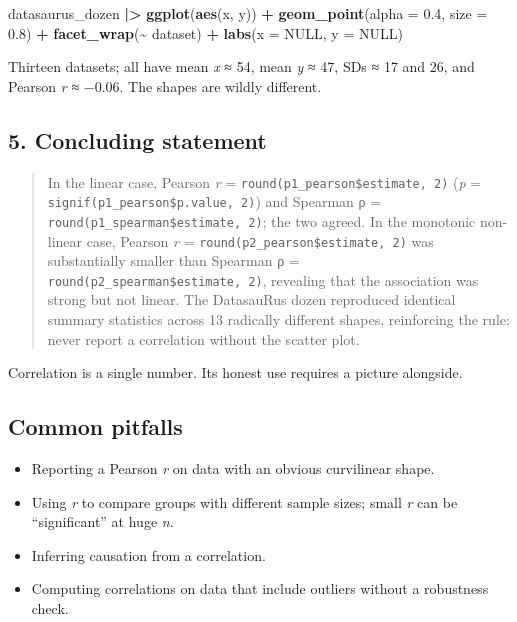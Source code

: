 \documentclass[
]{article}
\newenvironment{Shaded}{\begin{snugshade}}{\end{snugshade}}
\newcommand{\AttributeTok}[1]{\textcolor[rgb]{0.13,0.29,0.53}{#1}}
\newcommand{\ConstantTok}[1]{\textcolor[rgb]{0.56,0.35,0.01}{#1}}
\newcommand{\FloatTok}[1]{\textcolor[rgb]{0.00,0.00,0.81}{#1}}
\newcommand{\FunctionTok}[1]{\textcolor[rgb]{0.13,0.29,0.53}{\textbf{#1}}}
\newcommand{\NormalTok}[1]{#1}
\newcommand{\SpecialCharTok}[1]{\textcolor[rgb]{0.81,0.36,0.00}{\textbf{#1}}}
\providecommand{\tightlist}{%
  \setlength{\itemsep}{0pt}\setlength{\parskip}{0pt}}
\begin{document}
\begin{Shaded}
\begin{Highlighting}[]
\NormalTok{datasaurus\_dozen }\SpecialCharTok{|\textgreater{}}
  \FunctionTok{ggplot}\NormalTok{(}\FunctionTok{aes}\NormalTok{(x, y)) }\SpecialCharTok{+}
  \FunctionTok{geom\_point}\NormalTok{(}\AttributeTok{alpha =} \FloatTok{0.4}\NormalTok{, }\AttributeTok{size =} \FloatTok{0.8}\NormalTok{) }\SpecialCharTok{+}
  \FunctionTok{facet\_wrap}\NormalTok{(}\SpecialCharTok{\textasciitilde{}}\NormalTok{ dataset) }\SpecialCharTok{+}
  \FunctionTok{labs}\NormalTok{(}\AttributeTok{x =} \ConstantTok{NULL}\NormalTok{, }\AttributeTok{y =} \ConstantTok{NULL}\NormalTok{)}
\end{Highlighting}
\end{Shaded}

Thirteen datasets; all have mean \emph{x} ≈ 54, mean \emph{y} ≈ 47, SDs
≈ 17 and 26, and Pearson \emph{r} ≈ −0.06. The shapes are wildly
different.

\subsection{5. Concluding statement}\label{concluding-statement}

\begin{quote}
In the linear case, Pearson \emph{r} =
\texttt{round(p1\_pearson\$estimate,\ 2)} (\emph{p} =
\texttt{signif(p1\_pearson\$p.value,\ 2)}) and Spearman ρ =
\texttt{round(p1\_spearman\$estimate,\ 2)}; the two agreed. In the
monotonic non-linear case, Pearson \emph{r} =
\texttt{round(p2\_pearson\$estimate,\ 2)} was substantially smaller than
Spearman ρ = \texttt{round(p2\_spearman\$estimate,\ 2)}, revealing that
the association was strong but not linear. The DatasauRus dozen
reproduced identical summary statistics across 13 radically different
shapes, reinforcing the rule: never report a correlation without the
scatter plot.
\end{quote}

Correlation is a single number. Its honest use requires a picture
alongside.

\subsection{Common pitfalls}\label{common-pitfalls}

\begin{itemize}
\tightlist
\item
  Reporting a Pearson \emph{r} on data with an obvious curvilinear
  shape.
\item
  Using \emph{r} to compare groups with different sample sizes; small
  \emph{r} can be ``significant'' at huge \emph{n}.
\item
  Inferring causation from a correlation.
\item
  Computing correlations on data that include outliers without a
  robustness check.
\end{itemize}
\end{document}
